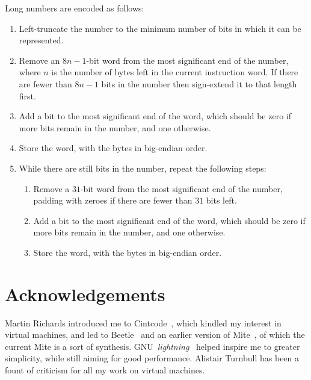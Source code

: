\documentclass[english]{scrartcl}
\begin{document}
Long numbers are encoded as follows:

\begin{enumerate}
\item Left-truncate the number to the minimum number of bits in which
      it can be represented.

\item Remove an $8n-1$-bit word from the most significant end of the
      number, where $n$ is the number of bytes left in the current
      instruction word. If there are fewer than $8n-1$ bits in the
      number then sign-extend it to that length first.

\item Add a bit to the most significant end of the word, which should
      be zero if more bits remain in the number, and one otherwise.

\item Store the word, with the bytes in big-endian order.

\item While there are still bits in the number, repeat the following
      steps:

\begin{enumerate}

\item Remove a $31$-bit word from the most significant end of the
      number, padding with zeroes if there are fewer than $31$ bits
      left.

\item Add a bit to the most significant end of the word, which should
      be zero if more bits remain in the number, and one otherwise.

\item Store the word, with the bytes in big-endian order.
\end{enumerate}

\end{enumerate}



\section{Acknowledgements}

Martin Richards introduced me to Cintcode~\cite{cintcode}, which
kindled my interest in virtual machines, and led to
Beetle~\cite{beetledis} and an earlier version of Mite~\cite{mite}, of
which the current Mite is a sort of synthesis. 
GNU~\emph{lightning}~\cite{lightning} helped inspire me to greater
simplicity, while still aiming for good performance. Alistair Turnbull
has been a fount of criticism for all my work on virtual machines.




\end{document}
